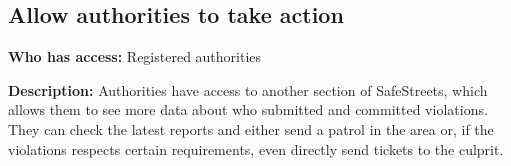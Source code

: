   \subsection{Allow authorities to take action}
  \begin{description}
    \item \textbf{Who has access:} \newline Registered authorities
    \item \textbf{Description:} \newline Authorities have access to another section of SafeStreets, which allows them to see more data about who submitted and committed violations. They can check the latest reports and either send a patrol in the area or, if the violations respects certain requirements, even directly send tickets to the culprit.
  \end{description} 